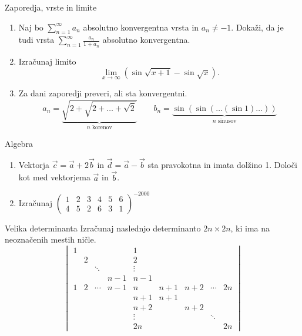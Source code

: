 \begin{frame}{Zaporedja, vrste in limite}
	\begin{enumerate}
		\item 
		Naj bo \( \sum_{n=1}^\infty a_n \) absolutno konvergentna vrsta in $a_n \ne -1$.
		Dokaži, da je tudi vrsta $\sum_{n=1}^\infty \frac{a_n}{1+a_n}$
		absolutno konvergentna.

		\item
		Izračunaj limito
		\[
		\lim_{x\to\infty}\left(\sin \sqrt{x+1}-\sin \sqrt{x}\right).
		\]

		\item
		Za dani zaporedji preveri, ali sta konvergentni.
		\[
		a_n = \underbrace{\sqrt{2+\sqrt{2+\dots+\sqrt{2}}}}_{n\text{ korenov}} \qquad
		b_n = \underbrace{\sin(\sin(\dots(\sin 1)\dots))}_{n\text{ sinusov}}
		\]
	\end{enumerate}
\end{frame}

\begin{frame}{Algebra}
	\begin{enumerate}
		\item
		Vektorja \( \vec{c} = \vec{a} + 2\vec{b} \) in \( \vec{d} = \vec{a} - \vec{b} \)
		sta pravokotna in imata dolžino 1. Določi kot med vektorjema $\vec{a}$ in $\vec{b}$.
		\item 
		Izračunaj \( \begin{pmatrix}
				1 & 2 & 3 & 4 & 5 & 6 \\
				4 & 5 & 2 & 6 & 3 & 1
		\end{pmatrix}^{-2000} \)
	\end{enumerate}
\end{frame}

\begin{frame}{Velika determinanta}
	Izračunaj naslednjo determinanto $2n \times 2n$, ki ima na neoznačenih mestih ničle.
	\[
	\begin{vmatrix}
		1 &   &                       &     & 1                     &     &     &                       &    \\
		& 2 &                       &     & 2                     &     &     &                       &    \\
		&   & \ddots &     & \vdots &     &     &                       &    \\
		&   &                       & n-1 & n-1                   &     &     &                       &    \\
	  1 & 2 & \cdots & n-1 & n                     & n+1 & n+2 & \cdots & 2n \\
		&   &                       &     & n+1                   & n+1 &     &                       &    \\
		&   &                       &     & n+2                   &     & n+2 &                       &    \\
		&   &                       &     & \vdots &     &     & \ddots &    \\
		&   &                       &     & 2n                    &     &     &                       & 2n
	\end{vmatrix}
	\]
\end{frame}

